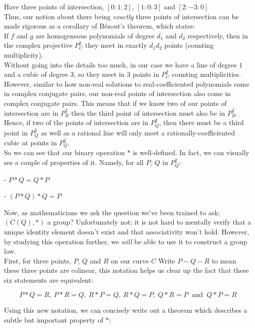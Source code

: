\documentclass{article}
\begin{document}
Have three points of intersection, $[0 : 1 : 2]$, $[1 : 0 : 3]$ and $[2 : -3 : 0]$\\

Thus, our notion about there being \emph{exactly} three points of intersection can be made rigorous as a corollary of Bézout's theorem, which states:\\

If $f$ and $g$ are homogeneous polynomials of degree $d_1$ and $d_2$ respectively, then in the complex projective $P_C^2$ they meet in exactly $d_1 d_2$ points (counting multiplicity).\\

Without going into the details too much, in our case we have a line of degree $1$ and a cubic of degree $3$, so they meet in $3$ points in $P_C^2$ counting multiplicities. However, similar to how non-real solutions to real-coefficiented polynomials come in complex conjugate pairs, our non-real points of intersection also come in complex conjugate pairs. This means that if we know two of our points of intersection are in $P_R^2$ then the third point of intersection must also be in $P_R^2$. Hence, if two of the points of intersection are in $P_Q^2$, then there must be a third point in $P_Q^2$ as well as a rational line will only meet a rationally-coefficiented cubic at points in $P_Q^2$.\\

So we can see that our binary operation $*$ is well-defined. In fact, we can visually see a couple of properties of it. Namely, for all $P$, $Q$ in $P_Q^2$:

- $P * Q = Q * P$

- $(P * Q) * Q = P$

Now, as mathematicians we ask the question we've been trained to ask: $(C(Q), *)$ a group? Unfortunately not; it is not hard to mentally verify that a unique identity element doesn't exist and that associativity won't hold. However, by studying this operation further, we \emph{will} be able to use it to construct a group law.\\

First, for three points, $P$, $Q$ and $R$ on our curve $C$ Write $P - Q - R$ to mean these three points are colinear, this notation helps us clear up the fact that these six statements are equivalent:

\[ P * Q = R, \ P * R = Q, \ R * P = Q, \ R * Q = P, \ Q * R = P \ \text{ and } \ Q * P = R \]

Using this new notation, we can concisely write out a theorem which describes a subtle but important property of $*$:\\
\end{document}
